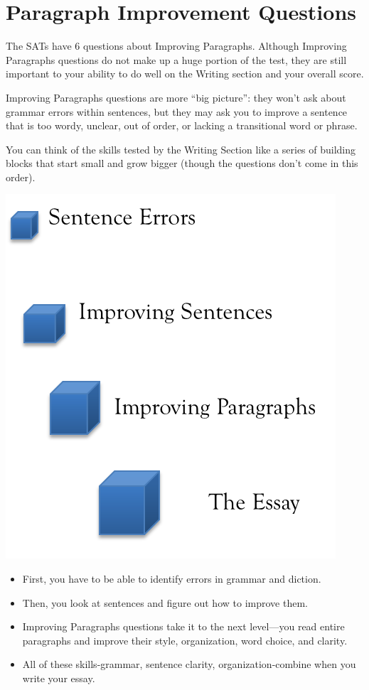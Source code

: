 \documentclass[12pt]{book}
\begin{document}
\newpage

\section[Paragraph Improvement]{Paragraph Improvement Questions}
The SATs have 6 questions about Improving Paragraphs. Although Improving Paragraphs questions do not make up a huge portion of the test, they are still important to your ability to do well on the Writing section and your overall score.  

\bigskip
Improving Paragraphs questions are more “big picture”: they won't ask about grammar errors within sentences, but they may ask you to improve a sentence that is too wordy, unclear, out of order, or lacking a transitional word or phrase.

\bigskip
You can think of the skills tested by the Writing Section like a series of building blocks that start small and grow bigger (though the questions don't come in this order). 

\begin{center}
\includegraphics{Essay}
 
\end{center}

\begin{itemize}
\item{First, you have to be able to identify errors in grammar and diction. }
\item{Then, you look at sentences and figure out how to improve them.}  
\item{Improving Paragraphs questions take it to the next level—you read entire paragraphs and improve their style, organization, word choice, and clarity.}
\item{All of these skills-grammar, sentence clarity, organization-combine when you write your essay. }
\end{itemize}
\end{document}

